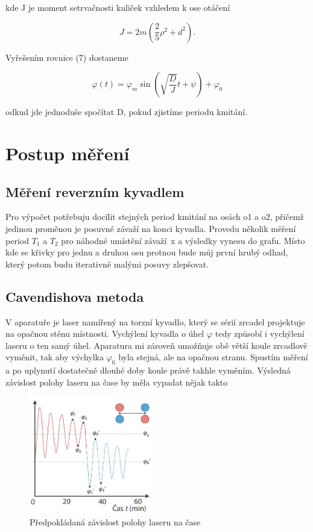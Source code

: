 \documentclass[a4paper,11pt]{article}
\begin{document}
\noindent
kde J je moment setrvačnosti kuliček vzhledem k ose otáčení

\begin{equation}
J = 2m ( \frac{2}{5} \rho^2 + d^2).
\end{equation}

Vyřešením rovnice (7) dostaneme

\begin{equation}
\varphi(t) = \varphi_m \sin(\sqrt{\frac{D}{J}}  t  + \psi) + \varphi_0
\end{equation}

\noindent
odkud jde jednoduše spočítat D, pokud zjistíme periodu kmitání.

\section{Postup měření}

\subsection{Měření reverzním kyvadlem}

Pro výpočet potřebuju docílit stejných period kmitání na osách o1 a o2, přičemž jedinou proměnou je posuvné závaží na konci kyvadla. Provedu několik měření period $T_1$ a $T_2$ pro náhodné umístění závaží~x a výsledky vynesu do grafu. Místo kde se křivky pro jednu a druhou osu protnou bude můj první hrubý odhad, který potom budu iterativně malými posuvy zlepšovat.

\subsection{Cavendishova metoda}

V aparatuře je laser namířený na torzní kyvadlo, který se sérií zrcadel projektuje na opačnou stěnu místnosti. Vychýlení kyvadla o úhel $\varphi$ tedy způsobí i vychýlení laseru o ten samý úhel. Aparatura mi zároveň umožňuje obě větší koule zrcadlově vyměnit, tak aby výchylka $\varphi_0$ byla stejná, ale na opačnou stranu. Spustím měření a po uplynutí dostatečně dlouhé doby koule právě takhle vyměním. Výsledná závislost polohy laseru na čase by měla vypadat nějak takto

\begin{figure}[htpb]
  \centering
  \includegraphics[width=0.48\textwidth]{cavendish_demo_mereni.jpg}
  \caption{Předpokládaná závislost polohy laseru na čase}
\end{figure}
\end{document}
